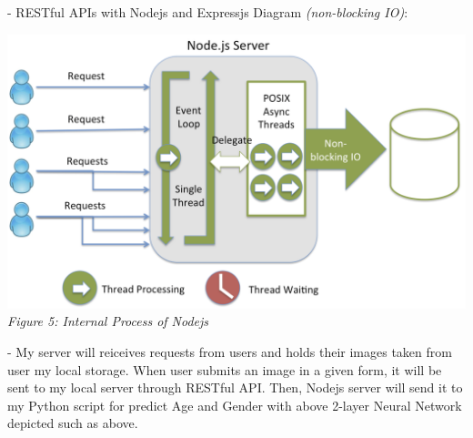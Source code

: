 - RESTful APIs with Nodejs and Expressjs Diagram \textit{(non-blocking IO)}:
\begin{center}
\includegraphics[scale=0.30]{restful-api} \\
\textit{Figure 5: Internal Process of Nodejs}
\end{center}

- My server will reiceives requests from users and holds their images taken from user my local storage. When user submits an image in a given form, it will be sent to my local server through RESTful API. Then, Nodejs server will send it to my Python script for predict Age and Gender with above 2-layer Neural Network depicted such as above.

